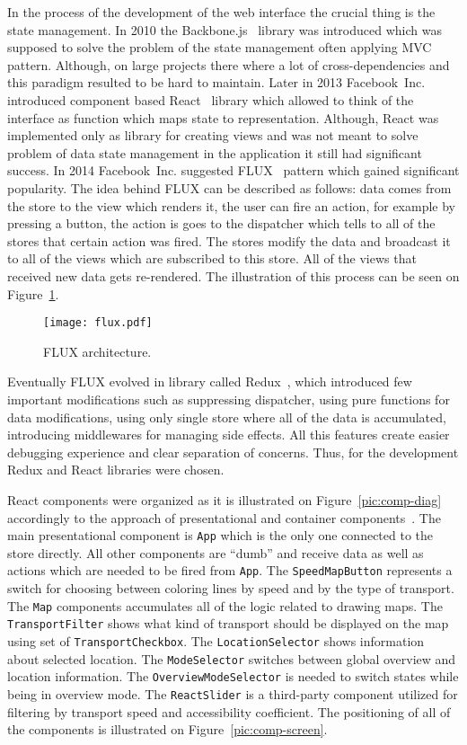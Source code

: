 In the process of the development of the web interface the crucial thing is the state management. In
2010 the Backbone.js~\cite{backbone} library was introduced which was supposed to solve the problem
of the state management often applying MVC~\cite{backbone:mvc} pattern. Although, on large projects
there where a lot of cross-dependencies and this paradigm resulted to be hard to maintain. Later in
2013 Facebook~Inc. introduced component based React~\cite{react} library which allowed to think of
the interface as function which maps state to representation. Although, React was implemented only
as library for creating views and was not meant to solve problem of data state management in the
application it still had significant success. In 2014 Facebook~Inc. suggested FLUX~\cite{flux}
pattern which gained significant popularity. The idea behind FLUX can be described as follows: data
comes from the store to the view which renders it, the user can fire an action, for example by
pressing a button, the action is goes to the dispatcher which tells to all of the stores that
certain action was fired. The stores modify the data and broadcast it to all of the views which are
subscribed to this store. All of the views that received new data gets re-rendered. The illustration
of this process can be seen on Figure~\ref{pic:flux}.

\begin{figure}[h]
  \centering
  \texttt{[image: flux.pdf]}
  \caption{FLUX architecture.}
  \label{pic:flux}
\end{figure}

Eventually FLUX evolved in library called Redux~\cite{redux}, which introduced few important
modifications such as suppressing dispatcher, using pure functions for data modifications, using
only single store where all of the data is accumulated, introducing middlewares for managing
side effects. All this features create easier debugging experience and clear separation
of concerns. Thus, for the development Redux and React libraries were chosen.

React components were organized as it is illustrated on Figure~\ref{pic:comp-diag} accordingly to
the approach of presentational and container components~\cite{redux:ppc}. The main presentational
component is \texttt{App} which is the only one connected to the store directly. All other
components are ``dumb'' and receive data as well as actions which are needed to be fired from
\texttt{App}. The \texttt{SpeedMapButton} represents a switch for choosing between coloring lines by
speed and by the type of transport. The \texttt{Map} components accumulates all of the logic related
to drawing maps. The \texttt{TransportFilter} shows what kind of transport should be displayed on
the map using set of \texttt{TransportCheckbox}. The \texttt{LocationSelector} shows
information about selected location. The \texttt{ModeSelector} switches between global overview and
location information. The \texttt{OverviewModeSelector} is needed to switch states
while being in overview mode. The \texttt{ReactSlider} is a third-party component utilized
for filtering by transport speed and accessibility coefficient. The positioning of all of
the components is illustrated on Figure~\ref{pic:comp-screen}.


